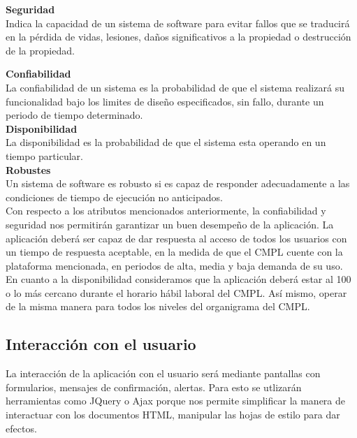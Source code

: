 \textbf{Seguridad\\}
Indica la capacidad de un sistema de software para evitar fallos que se traducirá en la pérdida de vidas, lesiones, daños significativos a la propiedad o destrucción de la propiedad.

\textbf{Confiabilidad\\}
La confiabilidad de un sistema es la probabilidad de que el sistema realizará su funcionalidad bajo los limites de diseño especificados, sin fallo, durante un periodo de tiempo determinado. \\

\textbf{Disponibilidad\\}
La disponibilidad es la probabilidad de que el sistema esta operando en un tiempo particular.\\ 

\textbf{Robustes\\}
Un sistema de software es robusto si es capaz de responder adecuadamente a las condiciones de tiempo de ejecución no anticipados.\\

Con respecto a los atributos mencionados anteriormente, la confiabilidad y seguridad nos permitirán garantizar un buen desempeño de la aplicación. La aplicación deberá ser capaz de dar respuesta al acceso de todos los usuarios con un tiempo de respuesta aceptable, en la medida de que el CMPL cuente con la plataforma mencionada, en periodos de alta, media y baja demanda de su uso.\\

En cuanto a la disponibilidad consideramos que la aplicación deberá estar al 100 o lo más cercano durante el horario hábil laboral del CMPL. Así mismo, operar de la misma manera para todos los niveles del organigrama del CMPL.\\

\subsection{Interacción con el usuario}

La interacción de la aplicación con el usuario será mediante pantallas con formularios, mensajes de confirmación, alertas. Para esto se utlizarán herramientas como JQuery o Ajax porque nos permite simplificar la manera de interactuar con los documentos HTML, manipular las hojas de estilo para dar efectos.

